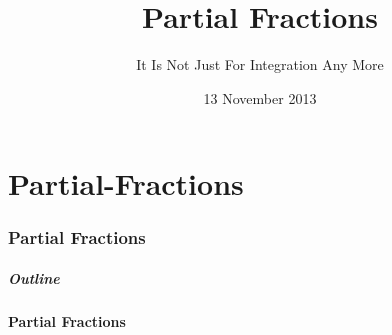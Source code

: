 \part{Partial-Fractions}
\section{Partial Fractions}


\title{Partial Fractions}
\subtitle{It Is Not Just For Integration Any More}
\date{13 November 2013}

\begin{frame}
  \titlepage
\end{frame}

\begin{frame}
  \frametitle{Outline}
  \tableofcontents[ currentsection ]
\end{frame}


\subsection{Partial Fractions}


